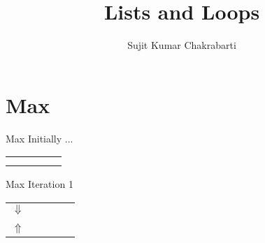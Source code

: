 \documentclass{beamer}
\title[Sujit]{Lists and Loops}
\author{Sujit Kumar Chakrabarti}
\institute{}
\date{}
\begin{document}
\maketitle

\section{Max}
\begin{frame}[fragile]{Max}
{Initially ...}
\begin{center}
\begin{tabular}{ccccc}
\begin{tikzpicture}
\node[circle, draw=Black, fill=Black, minimum height=0.5cm] {};
\end{tikzpicture}
&
\begin{tikzpicture}
\node[circle, draw=Black, fill=Black, minimum height=0.2cm] {};
\end{tikzpicture}
&
\begin{tikzpicture}
\node[circle, draw=Black, fill=Black, minimum height=1cm] {};
\end{tikzpicture}
&
\begin{tikzpicture}
\node[circle, draw=Black, fill=Black, minimum height=2cm] {};
\end{tikzpicture}
&
\begin{tikzpicture}
\node[circle, draw=Black, fill=Black, minimum height=1.5cm] {};
\end{tikzpicture}
\\
&&&&
\end{tabular}
\end{center}
\end{frame}

\begin{frame}[fragile]{Max}
{Iteration 1}
\begin{center}
\begin{tabular}{ccccc}
{\Large\color{Blue}$\Downarrow$} &&&& \\
\begin{tikzpicture}
\node[circle, draw=Black, fill=Black, minimum height=0.5cm] {};
\end{tikzpicture}
&
\begin{tikzpicture}
\node[circle, draw=Black, fill=Black, minimum height=0.2cm] {};
\end{tikzpicture}
&
\begin{tikzpicture}
\node[circle, draw=Black, fill=Black, minimum height=1cm] {};
\end{tikzpicture}
&
\begin{tikzpicture}
\node[circle, draw=Black, fill=Black, minimum height=2cm] {};
\end{tikzpicture}
&
\begin{tikzpicture}
\node[circle, draw=Black, fill=Black, minimum height=1.5cm] {};
\end{tikzpicture}
\\
{\Large\color{Red}$\Uparrow$} &&&&
\end{tabular}
\end{center}
\end{frame}
\end{document}
